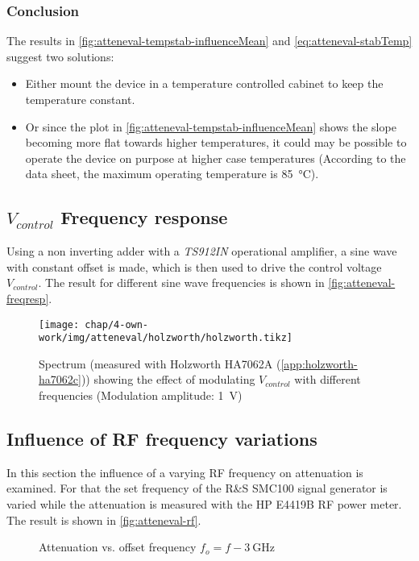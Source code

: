 \FloatBarrier
\subsubsection{Conclusion}
The results in \autoref{fig:atteneval-tempstab-influenceMean} and \autoref{eq:atteneval-stabTemp} suggest two solutions:
\begin{itemize}
\item Either mount the device in a temperature controlled cabinet to keep the temperature constant.
\item Or since the plot in \autoref{fig:atteneval-tempstab-influenceMean} shows the slope becoming more flat towards higher temperatures, it could may be possible to operate the device on purpose at higher case temperatures (According to the data sheet\cite{mini-circuitsZX732500VoltageVariable}, the maximum operating temperature is \SI{85}{\degreeCelsius}).
\end{itemize}

\FloatBarrier
\newpage
\subsection{$V_{control}$ Frequency response}
Using a non inverting adder with a \textit{TS912IN} operational amplifier, a sine wave with constant offset is made, which is then used to drive the control voltage $V_{control}$. The result for different sine wave frequencies is shown in \autoref{fig:atteneval-freqresp}.

\begin{figure}[tb]
	\centering
	\texttt{[image: chap/4-own-work/img/atteneval/holzworth/holzworth.tikz]}
	\caption{Spectrum (measured with Holzworth HA7062A (\autoref{app:holzworth-ha7062c})) showing the effect of modulating $V_{control}$ with different frequencies (Modulation amplitude: \SI{1}{\volt})}
	\label{fig:atteneval-freqresp}
\end{figure}

\FloatBarrier
\newpage
\subsection{Influence of RF frequency variations}
In this section the influence of a varying RF frequency on attenuation is examined. For that the set frequency of the R\&S SMC100 signal generator is varied while the attenuation is measured with the HP E4419B RF power meter. The result is shown in \autoref{fig:atteneval-rf}.
\begin{figure}[tb]
    \centering
        \subfloat[$f_o=\SI{+-30}{\kHz}$]{}
        \qquad
        \subfloat[$f_o=\SI{+-1}{\kHz}$]{}
       \caption{Attenuation vs. offset frequency $f_o=f-\SI{3}{\GHz}$}
    \label{fig:atteneval-rf}
\end{figure}

